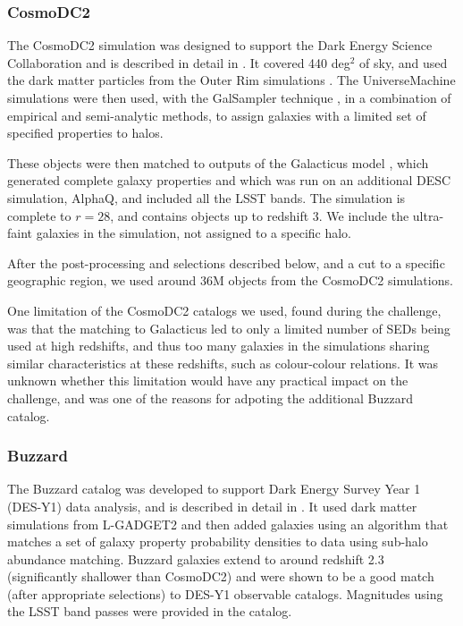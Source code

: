 \documentclass[twocolumn,twocolappendix]{aastex63}
\begin{document}
\subsubsection{CosmoDC2}

The CosmoDC2 simulation was designed to support the Dark Energy Science
Collaboration and is described in detail in \citet{cosmodc2}.  It covered 440
deg${}^2$ of sky, and used the dark matter particles from the Outer Rim
simulations \citep{outer_rim}.  The UniverseMachine \citep{universe_machine}
simulations were then used, with the GalSampler technique \citep{galsampler},
in a combination of empirical and semi-analytic
methods, to assign galaxies with a limited set of specified properties to halos.

These objects were then matched to outputs of the Galacticus model
\citep{galacticus}, which generated complete galaxy properties and which was run
on an additional DESC simulation, AlphaQ, and included all the LSST bands.  The
simulation is complete to $r=28$, and contains objects up to redshift 3.  We
include the ultra-faint galaxies in the simulation, not assigned to a specific
halo.

After the post-processing and selections described below, and a cut to a specific geographic region, 
we used around 36M objects from the CosmoDC2 simulations.

One limitation of the CosmoDC2 catalogs we used, found during the challenge,
was that the matching to Galacticus led to only a limited number of SEDs being
used at high redshifts, and thus too many galaxies in the simulations sharing
similar characteristics at these redshifts, such as colour-colour relations.
It was unknown whether this limitation would have any practical impact on the challenge,
and was one of the reasons for adpoting the additional Buzzard catalog.

\subsubsection{Buzzard}

The Buzzard catalog was developed to support Dark Energy Survey Year 1 (DES-Y1)
data analysis, and is described in detail in \citet{buzzard}.  It used dark
matter simulations from L-GADGET2 \cite{gadget2} and then added galaxies using
an algorithm that matches a set of galaxy
property probability densities to data using sub-halo abundance matching. 
Buzzard galaxies extend to around redshift 2.3 (significantly shallower than CosmoDC2)
and were shown to be a good
match (after appropriate selections) to DES-Y1 observable catalogs.  Magnitudes
using the LSST band passes were provided in the catalog.
\end{document}
